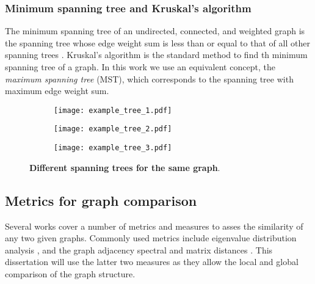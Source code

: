 \subsubsection{Minimum spanning tree and Kruskal's algorithm}
The minimum spanning tree of an undirected, connected, and weighted graph is the spanning tree whose edge weight sum is less than or equal to that of all other spanning trees \cite{Sefidgarminimumspanningtree}. Kruskal's algorithm \cite{Kershenbaum1972Computingminimumspanning} is the standard method to find th minimum spanning tree of a graph. In this work we use an equivalent concept, the \emph{maximum spanning tree} (MST), which corresponds to the spanning tree with maximum edge weight sum.
\begin{figure*}[!t]
	\centering	
	\hspace*{\fill}
	\begin{subfigure}[t]{0.32\textwidth}
		\subcaption{}
		\texttt{[image: example\_tree\_1.pdf]}
		\label{fig:example_tree_1}
	\end{subfigure}	
	\hfill
	\begin{subfigure}[t]{0.32\textwidth}
		\subcaption{}
		\texttt{[image: example\_tree\_2.pdf]}
		\label{fig:example_tree_2}
	\end{subfigure}
	\hfill
	\begin{subfigure}[t]{0.32\textwidth}
		\subcaption{}
		\texttt{[image: example\_tree\_3.pdf]}
		\label{fig:example_tree_3}
	\end{subfigure}	
	\hspace*{\fill}	
	\caption[] {\label{fig:tree_examples} \textbf{Different spanning trees for the same graph}.}
\end{figure*}

\subsection{Metrics for graph comparison}
Several works cover a number of metrics and measures to asses the similarity of any two given graphs. Commonly used metrics include eigenvalue distribution analysis \cite{Crawford2017GraphStructureSimilarity,Gera2018Identifyingnetworkstructure}, and the graph adjacency spectral and matrix distances \cite{Wills2020Metricsgraphcomparison}. This dissertation will use the latter two measures as they allow the local and global comparison of the graph structure.

